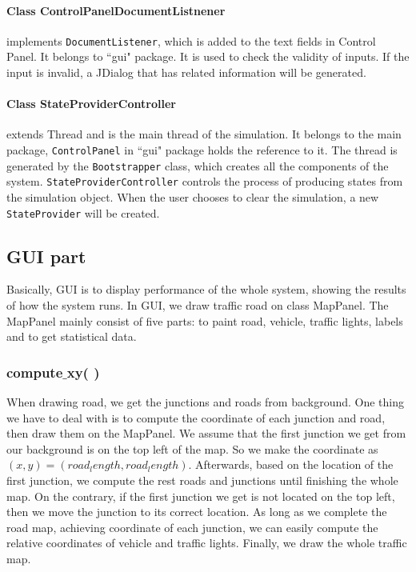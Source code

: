 \documentclass[a4paper,12pt]{article}
\begin{document}
\paragraph{Class ControlPanelDocumentListnener} implements \verb|DocumentListener|, which is added to the text fields in Control Panel. It belongs to ``gui" package. It is used to check the validity of inputs. If the input is invalid, a JDialog that has related information will be generated.
\paragraph{Class StateProviderController} extends Thread and is the main thread of the simulation. It belongs to the main package, \verb|ControlPanel| in ``gui" package holds the reference to it. The thread is generated by the \verb|Bootstrapper| class, which creates all the components of the system. \verb|StateProviderController| controls the process of producing states from the simulation object. When the user chooses to clear the simulation, a new \verb|StateProvider| will be created.

\subsection{GUI part}

Basically, GUI is to display performance of the whole system, showing the results of how the system runs. In GUI, we draw traffic road on class MapPanel. The MapPanel mainly consist of five parts: to paint road, vehicle, traffic lights, labels and to get statistical data.

\subsubsection{compute$\_$xy( )}
When drawing road, we get the junctions and roads from background. One thing we have to deal with is to compute the coordinate of each junction and road, then draw them on the MapPanel. We assume that the first junction we get from our background is on the top left of the map. So we make the coordinate as $(x,y)=(road_length, road_length)$. Afterwards, based on the location of the first junction, we compute the rest roads and junctions until finishing the whole map. On the contrary, if the first junction we get is not located on the top left, then we move the junction to its correct location. As long as we complete the road map, achieving coordinate of each junction, we can easily compute the relative coordinates of vehicle and traffic lights. Finally, we draw the whole traffic map.
\end{document}
